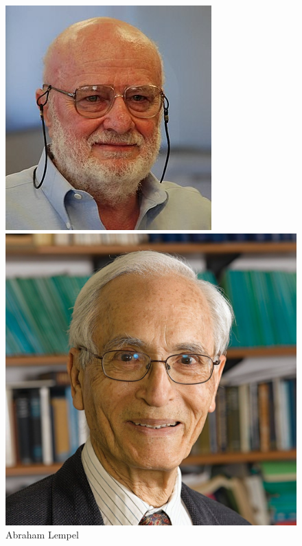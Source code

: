 \begin{figure}[ht]
    \centering
    \begin{minipage}{0.3\textwidth}
        \centering
        \includegraphics[width = \textwidth, height=1.1\textwidth]{Figures/lempel.jpg}
        \captionsetup{font=small}
        \caption{Abraham Lempel}
        \label{fig:fig1}
    \end{minipage}%
    \hfill
    \begin{minipage}{0.3\textwidth}
        \centering
        \includegraphics[width=\linewidth, height=1.1\textwidth]{Figures/Ziv.jpeg}

\end{minipage}
\end{figure}
